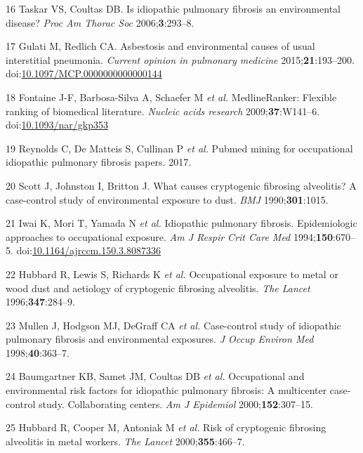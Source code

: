 \documentclass[12pt,a4paper,]{report}
\begin{document}
\leavevmode\hypertarget{ref-Taskar2006}{}%
16 Taskar VS, Coultas DB. Is idiopathic pulmonary fibrosis an
environmental disease? \emph{Proc Am Thorac Soc} 2006;\textbf{3}:293--8.

\leavevmode\hypertarget{ref-Gulati2015}{}%
17 Gulati M, Redlich CA. Asbestosis and environmental causes of usual
interstitial pneumonia. \emph{Current opinion in pulmonary medicine}
2015;\textbf{21}:193--200.
doi:\href{https://doi.org/10.1097/MCP.0000000000000144}{10.1097/MCP.0000000000000144}

\leavevmode\hypertarget{ref-Fontaine2009}{}%
18 Fontaine J-F, Barbosa-Silva A, Schaefer M \emph{et al.}
MedlineRanker: Flexible ranking of biomedical literature. \emph{Nucleic
acids research} 2009;\textbf{37}:W141--6.
doi:\href{https://doi.org/10.1093/nar/gkp353}{10.1093/nar/gkp353}

\leavevmode\hypertarget{ref-Reynolds2017pubmed}{}%
19 Reynolds C, De Matteis S, Cullinan P \emph{et al.} Pubmed mining for
occupational idiopathic pulmonary fibrosis papers. 2017.

\leavevmode\hypertarget{ref-Scott1990}{}%
20 Scott J, Johnston I, Britton J. What causes cryptogenic fibrosing
alveolitis? A case-control study of environmental exposure to dust.
\emph{BMJ} 1990;\textbf{301}:1015.

\leavevmode\hypertarget{ref-Iwai1994}{}%
21 Iwai K, Mori T, Yamada N \emph{et al.} Idiopathic pulmonary fibrosis.
Epidemiologic approaches to occupational exposure. \emph{Am J Respir
Crit Care Med} 1994;\textbf{150}:670--5.
doi:\href{https://doi.org/10.1164/ajrccm.150.3.8087336}{10.1164/ajrccm.150.3.8087336}

\leavevmode\hypertarget{ref-Hubbard1996a}{}%
22 Hubbard R, Lewis S, Richards K \emph{et al.} Occupational exposure to
metal or wood dust and aetiology of cryptogenic fibrosing alveolitis.
\emph{The Lancet} 1996;\textbf{347}:284--9.

\leavevmode\hypertarget{ref-Mullen1998}{}%
23 Mullen J, Hodgson MJ, DeGraff CA \emph{et al.} Case-control study of
idiopathic pulmonary fibrosis and environmental exposures. \emph{J Occup
Environ Med} 1998;\textbf{40}:363--7.

\leavevmode\hypertarget{ref-Baumgartner2000}{}%
24 Baumgartner KB, Samet JM, Coultas DB \emph{et al.} Occupational and
environmental risk factors for idiopathic pulmonary fibrosis: A
multicenter case-control study. Collaborating centers. \emph{Am J
Epidemiol} 2000;\textbf{152}:307--15.

\leavevmode\hypertarget{ref-Hubbard2000}{}%
25 Hubbard R, Cooper M, Antoniak M \emph{et al.} Risk of cryptogenic
fibrosing alveolitis in metal workers. \emph{The Lancet}
2000;\textbf{355}:466--7.
\end{document}
